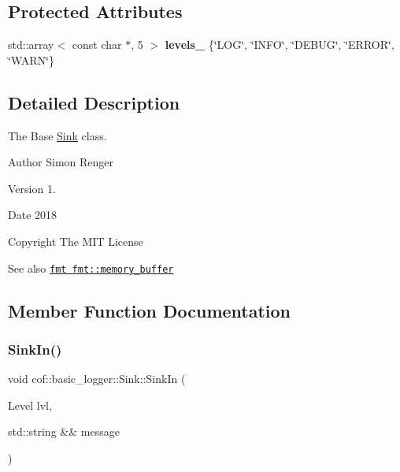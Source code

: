 \subsection*{Protected Attributes}
\begin{DoxyCompactItemize}
\item 
\mbox{\label{classcof_1_1basic__logger_1_1_sink_a8befddc7ae7d03530bc059a3173715ef}} 
std\+::array$<$ const char $\ast$, 5 $>$ {\bfseries levels\+\_\+} \{\char`\"{}L\+OG\char`\"{}, \char`\"{}I\+N\+FO\char`\"{}, \char`\"{}D\+E\+B\+UG\char`\"{}, \char`\"{}E\+R\+R\+OR\char`\"{}, \char`\"{}W\+A\+RN\char`\"{}\}
\end{DoxyCompactItemize}


\subsection{Detailed Description}
The Base \hyperlink{classcof_1_1basic__logger_1_1_sink}{Sink} class. 

\begin{DoxyAuthor}{Author}
Simon Renger
\end{DoxyAuthor}
\begin{DoxyVersion}{Version}
1. 
\end{DoxyVersion}
\begin{DoxyDate}{Date}
2018 
\end{DoxyDate}
\begin{DoxyCopyright}{Copyright}
The M\+IT License 
\end{DoxyCopyright}
\begin{DoxySeeAlso}{See also}
\href{https://github.com/fmtlib/fmt/}{\tt fmt fmt\+::memory\+\_\+buffer} 
\end{DoxySeeAlso}


\subsection{Member Function Documentation}
\mbox{\label{classcof_1_1basic__logger_1_1_sink_a085f8c690add00cf55ef0754c5900397}} 
\subsubsection{\texorpdfstring{Sink\+In()}{SinkIn()}}
{\footnotesize\ttfamily void cof\+::basic\+\_\+logger\+::\+Sink\+::\+Sink\+In (\begin{DoxyParamCaption}\item[{Level}]{lvl,  }\item[{std\+::string \&\&}]{message }\end{DoxyParamCaption})}



